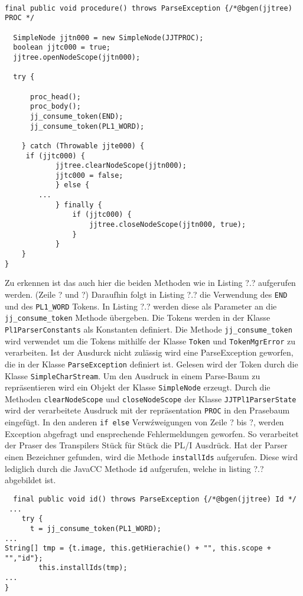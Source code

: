 \begin{verbatim}

final public void procedure() throws ParseException {/*@bgen(jjtree) PROC */
  
  SimpleNode jjtn000 = new SimpleNode(JJTPROC);
  boolean jjtc000 = true;
  jjtree.openNodeScope(jjtn000);
    
  try {
      
      proc_head();
      proc_body();
      jj_consume_token(END);
      jj_consume_token(PL1_WORD);
    
	} catch (Throwable jjte000) {
	 if (jjtc000) {
        	jjtree.clearNodeScope(jjtn000);
        	jjtc000 = false;
      		} else {
		...
      		} finally {
      			if (jjtc000) {
        			jjtree.closeNodeScope(jjtn000, true);
      			}
    		}
	}
}
\end{verbatim}

Zu erkennen ist das auch hier die beiden Methoden wie in Listing ?.? aufgerufen werden. (Zeile ? und ?)
Daraufhin folgt in Listing ?.? die Verwendung des \verb+END+ und des \verb+PL1_WORD+ Tokens.
In Listing ?.? werden diese als Parameter an die \verb+jj_consume_token+ Methode übergeben.
Die Tokens werden in der Klasse \verb+Pl1ParserConstants+ als Konstanten definiert.
Die Methode \verb+jj_consume_token+ wird verwendet um die Tokens mithilfe der Klasse \verb+Token+ und \verb+TokenMgrError+ zu verarbeiten.
Ist der Ausdurck nicht zulässig wird eine ParseException geworfen, die in der Klasse \verb+ParseException+ definiert ist.
Gelesen wird der Token durch die Klasse \verb+SimpleCharStream+. Um den Ausdruck in einem Parse-Baum zu repräsentieren wird ein Objekt der Klasse \verb+SimpleNode+ erzeugt. Durch die Methoden \verb+clearNodeScope+ und \verb+closeNodeScope+ der Klasse \verb+JJTPl1ParserState+ wird der verarbeitete Ausdruck mit der repräsentation \verb+PROC+ in den Prasebaum eingefügt. In den anderen \verb+if else+ Verwźweigungen von Zeile ? bis ?, werden Exception abgefragt und ensprechende Fehlermeldungen geworfen.
So verarbeitet der Praser des Transpilers Stück für Stück die PL/I Ausdrück. Hat der Parser einen Bezeichner gefunden, wird die Methode \verb+installIds+ aufgerufen. Diese wird lediglich durch die JavaCC Methode \verb+id+ aufgerufen, welche in listing ?.? abgebildet ist.

\begin{verbatim}
  final public void id() throws ParseException {/*@bgen(jjtree) Id */
 ...
    try {
      t = jj_consume_token(PL1_WORD);
...
String[] tmp = {t.image, this.getHierachie() + "", this.scope + "","id"};
        this.installIds(tmp);
...
}\end{verbatim}

